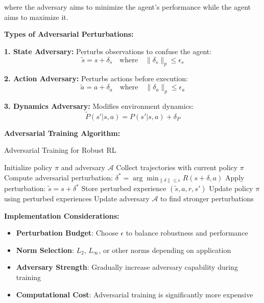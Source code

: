 \documentclass[12pt]{article}
\begin{document}
{{{{where the adversary aims to minimize the agent's performance while the agent aims to maximize it.

\textbf{Types of Adversarial Perturbations:}

\textbf{1. State Adversary:}
Perturbs observations to confuse the agent:
\begin{equation}
\tilde{s} = s + \delta_s \quad \text{where} \quad \|\delta_s\|_p \leq \epsilon_s
\end{equation}

\textbf{2. Action Adversary:}
Perturbs actions before execution:
\begin{equation}
\tilde{a} = a + \delta_a \quad \text{where} \quad \|\delta_a\|_p \leq \epsilon_a
\end{equation}

\textbf{3. Dynamics Adversary:}
Modifies environment dynamics:
\begin{equation}
\tilde{P}(s'|s,a) = P(s'|s,a) + \delta_P
\end{equation}

\textbf{Adversarial Training Algorithm:}
\begin{algorithm}[H]
\caption{Adversarial Training for Robust RL}
\begin{algorithmic}[1]
\STATE Initialize policy $\pi$ and adversary $\mathcal{A}$
    \STATE Collect trajectories with current policy $\pi$
        \STATE Compute adversarial perturbation: $\delta^* = \arg\min_{\|\delta\| \leq \epsilon} R(s+\delta, a)$
        \STATE Apply perturbation: $\tilde{s} = s + \delta^*$
        \STATE Store perturbed experience $(\tilde{s}, a, r, s')$
    \ENDFOR
    \STATE Update policy $\pi$ using perturbed experiences
    \STATE Update adversary $\mathcal{A}$ to find stronger perturbations
\ENDFOR
\end{algorithmic}
\end{algorithm}

\textbf{Implementation Considerations:}
\begin{itemize}
\item \textbf{Perturbation Budget}: Choose $\epsilon$ to balance robustness and performance
\item \textbf{Norm Selection}: $L_2$, $L_\infty$, or other norms depending on application
\item \textbf{Adversary Strength}: Gradually increase adversary capability during training
\item \textbf{Computational Cost}: Adversarial training is significantly more expensive
\end{itemize}

}}}}
\end{document}
